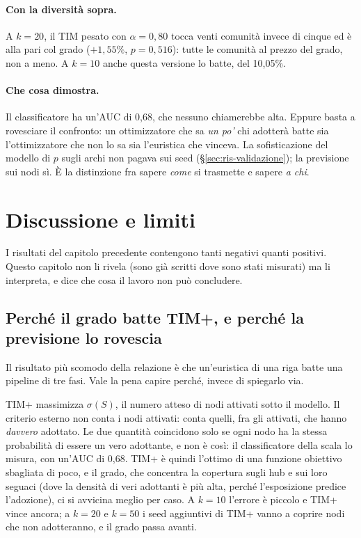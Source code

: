 \documentclass[11pt,a4paper]{article}
\begin{document}
\paragraph{Con la diversità sopra.} A $k = 20$, il TIM pesato con $\alpha = 0{,}80$ tocca venti comunità invece di cinque ed è alla pari col grado ($+1{,}55\%$, $p = 0{,}516$): tutte le comunità al prezzo del grado, non a meno. A $k = 10$ anche questa versione lo batte, del 10,05\%.

\paragraph{Che cosa dimostra.} Il classificatore ha un'AUC di 0,68, che nessuno chiamerebbe alta. Eppure basta a rovesciare il confronto: un ottimizzatore che sa \emph{un po'} chi adotterà batte sia l'ottimizzatore che non lo sa sia l'euristica che vinceva. La sofisticazione del modello di $p$ sugli archi non pagava sui seed (\S\ref{sec:ris-validazione}); la previsione sui nodi sì. È la distinzione fra sapere \emph{come} si trasmette e sapere \emph{a chi}.

\clearpage
\section{Discussione e limiti}
\label{sec:discussione}

I risultati del capitolo precedente contengono tanti negativi quanti positivi. Questo capitolo non li rivela (sono già scritti dove sono stati misurati) ma li interpreta, e dice che cosa il lavoro non può concludere.

\subsection{Perché il grado batte TIM+, e perché la previsione lo rovescia}
Il risultato più scomodo della relazione è che un'euristica di una riga batte una pipeline di tre fasi. Vale la pena capire perché, invece di spiegarlo via.

TIM+ massimizza $\sigma(S)$, il numero atteso di nodi attivati sotto il modello. Il criterio esterno non conta i nodi attivati: conta quelli, fra gli attivati, che hanno \emph{davvero} adottato. Le due quantità coincidono solo se ogni nodo ha la stessa probabilità di essere un vero adottante, e non è così: il classificatore della scala lo misura, con un'AUC di 0,68. TIM+ è quindi l'ottimo di una funzione obiettivo sbagliata di poco, e il grado, che concentra la copertura sugli hub e sui loro seguaci (dove la densità di veri adottanti è più alta, perché l'esposizione predice l'adozione), ci si avvicina meglio per caso. A $k = 10$ l'errore è piccolo e TIM+ vince ancora; a $k = 20$ e $k = 50$ i seed aggiuntivi di TIM+ vanno a coprire nodi che non adotteranno, e il grado passa avanti.
\end{document}
